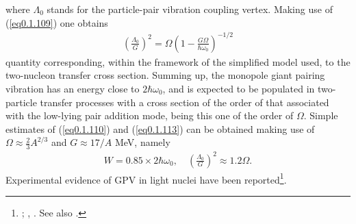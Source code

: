 where $\Lambda_0$ stands for the particle-pair vibration coupling vertex. Making use of (\ref{eq0.1.109}) one obtains
\begin{align}\label{eq0.1.113}
\left(\frac{\Lambda_0}{G}\right)^2=\Omega\left(1-\frac{G\Omega}{\hbar\omega_0}\right)^{-1/2}
\end{align}
quantity corresponding, within the framework of the simplified model used, to the two-nucleon transfer cross section. Summing up, the monopole giant pairing vibration has an energy close to $2\hbar\omega_0$, and is expected to be populated in two-particle transfer processes with a cross section of the order of that associated with the low-lying pair addition mode, being this one of the order of $\Omega$. Simple estimates of (\ref{eq0.1.110}) and (\ref{eq0.1.113}) can be obtained making use of $\Omega\approx\frac{2}{3}A^{2/3}$
and $G\approx17/A$ MeV, namely 
\begin{align}\label{eq0.1.114}
W=0.85\times2\hbar\omega_0,\quad\left(\frac{\Lambda_0}{G}\right)^2\approx1.2 \Omega.
\end{align}
Experimental evidence of GPV in light nuclei have been reported\footnote{\cite{Cappuzzello:15}; \cite{Cavallaro:19},  \cite{Bortignon:16}. See also \cite{Laskin:16,Betan:02,Dussel:09,Mouginot:11,Khan:04,Avez:08,Khan:09,Dasso:15,Fortunato:02,Herzog:86,Betan:02}.}.
